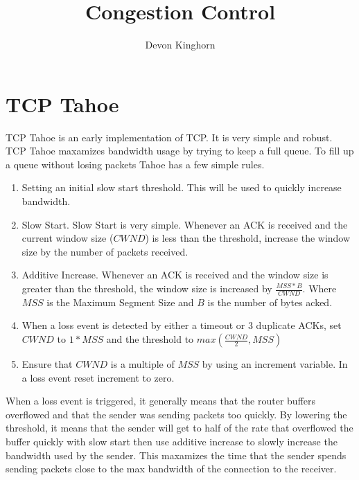 \documentclass[fleqn,11pt]{article}
\begin{document}
\lstset{
  language=Python,
  basicstyle=\small,          %
  keywordstyle=\bfseries,
  identifierstyle=,           %
  commentstyle=,              %
  stringstyle=\ttfamily,      %
  showstringspaces=false,     %
  numbers=left,
  numberstyle=\tiny,
  numbersep=5pt,
  frame=tb,
}

\title{Congestion Control}

\author{Devon Kinghorn}

\date{}

\maketitle

\section{TCP Tahoe}

TCP Tahoe is an early implementation of TCP. It is very simple and robust. 
TCP Tahoe maxamizes bandwidth usage by trying to keep a full queue. 
To fill up a queue without losing packets Tahoe has a few simple rules.

\begin{enumerate}
  \item Setting an initial slow start threshold. 
  This will be used to quickly increase bandwidth.
  \item Slow Start. Slow Start is very simple. 
  Whenever an ACK is received and the current window size ($CWND$) is less than the threshold, increase the window size by the number of packets received.
  \item Additive Increase. Whenever an ACK is received and the window size is greater than the threshold, the window size is increased by 
  $\frac{MSS * B}{CWND}$.
   Where $MSS$ is the Maximum Segment Size and $B$ is the number of bytes acked.
   \item When a loss event is detected by either a timeout or 3 duplicate ACKs, set $CWND$ to $1 * MSS$ 
   and the threshold to $max(\frac{CWND}{2},MSS)$
   \item Ensure that $CWND$ is a multiple of $MSS$ by using an increment variable. In a loss event reset increment to zero.
\end{enumerate}

When a loss event is triggered, it generally means that the router buffers overflowed and that the 
sender was sending packets too quickly.
By lowering the threshold, it means that the sender will get to half of the rate that overflowed the buffer quickly with slow start then use additive increase to slowly increase the bandwidth used by the sender.
This maxamizes the time that the sender spends sending packets close to the max bandwidth of the connection to the receiver.
\end{document}

